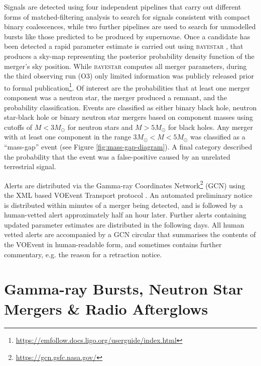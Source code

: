 Signals are detected using four independent pipelines that carry out different forms of matched-filtering analysis to search for signals consistent with compact binary coalescences, while two further pipelines are used to search for unmodelled bursts like those predicted to be produced by supernovae.  Once a candidate has been detected a rapid parameter estimate is carried out using \textsc{bayestar} \citep{2016PhRvD..93b4013S}, that produces a sky-map representing the posterior probability density function of the merger's sky position. While \textsc{bayestar} computes all merger parameters, during the third observing run (O3) only limited information was publicly released prior to formal publication\footnote{\url{https://emfollow.docs.ligo.org/userguide/index.html}}. Of interest are the probabilities that at least one merger component was a neutron star, the merger produced a remnant, and the probability classification. Events are classified as either binary black hole, neutron star-black hole or binary neutron star mergers based on component masses using cutoffs of $M<3M_{\odot}$ for neutron stars and $M>5M_{\odot}$ for black holes. Any merger with at least one component in the range $3M_{\odot}<M<5M_{\odot}$ was classified as a ``mass-gap'' event (see Figure \ref{fig:mass-gap-diagram}). A final category described the probability that the event was a false-positive caused by an unrelated terrestrial signal.

Alerts are distributed via the Gamma-ray Coordinates Network\footnote{\url{https://gcn.gsfc.nasa.gov/}} (GCN) using the XML based VOEvent Transport protocol \citep{2006ASPC..351..637W}. An automated preliminary notice is distributed within minutes of a merger being detected, and is followed by a human-vetted alert approximately half an hour later. Further alerts containing updated parameter estimates are distributed in the following days. All human vetted alerts are accompanied by a GCN circular that summarises the contents of the VOEvent in human-readable form, and sometimes contains further commentary, e.g. the reason for a retraction notice. 




\section{Gamma-ray Bursts, Neutron Star Mergers \& Radio Afterglows}
\label{sec:grb_intro}
